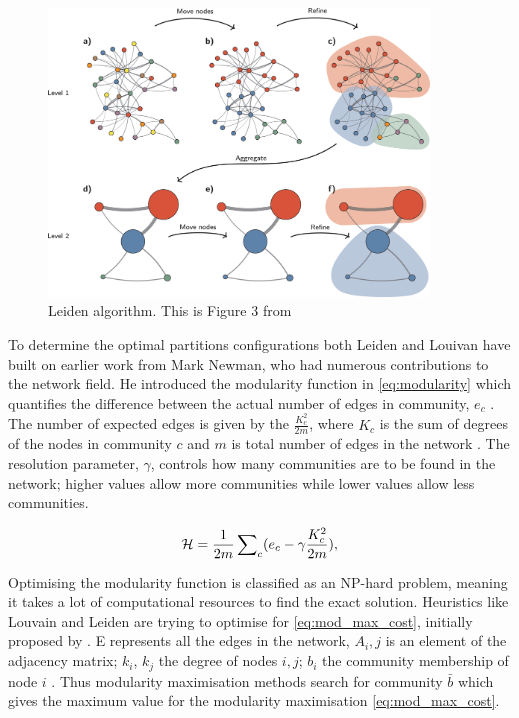 \begin{figure}[!htb]    
    \centering
\includegraphics[width=0.9\textwidth,height=0.9\textheight,keepaspectratio]{Sections/Lit_review/Resources/Leiden_algorithm.png}
    \caption[Leiden algorithm]{Leiden algorithm. This is Figure 3 from \citet{Traag2019-ne}}
    \label{fig:N_I:leiden-explained}
\end{figure}



To determine the optimal partitions configurations both Leiden and Louivan have built on earlier work from Mark Newman, who had numerous contributions to the network field. He introduced the modularity function in \cref{eq:modularity} which quantifies the difference between the actual number of edges in community, $e_c$ \citep{Newman2004-dd}. The number of expected edges is given by the $\frac{K_c^2}{2m}$, where $K_c$ is the sum of degrees of the nodes in community $c$ and $m$ is total number of edges in the network \citep{Traag2019-ne}. The resolution parameter, $\gamma$, controls how many communities are to be found in the network; higher values allow more communities while lower values allow less communities.


\begin{equation} \label{eq:modularity}
    {\mathcal H} =\frac{1}{2m}\,{\sum }_{c}({e}_{c}-{\rm{\gamma }}\frac{{K}_{c}^{2}}{2m}),
\end{equation}

Optimising the modularity function is classified as an NP-hard problem, meaning it takes a lot of computational resources to find the exact solution. Heuristics like Louvain and Leiden are trying to optimise for \cref{eq:mod_max_cost}, initially proposed by \cite{Newman2006-fa}. E represents all the edges in the network, $A_i,j$ is an element of the adjacency matrix; $k_i$, $k_j$ the degree of nodes $i,j$; $b_i$ the community membership of node $i$ \citep{Peixoto2021-jx}. Thus modularity maximisation methods search for community $\bar{b}$ which gives the maximum value for the modularity maximisation \cref{eq:mod_max_cost}.

